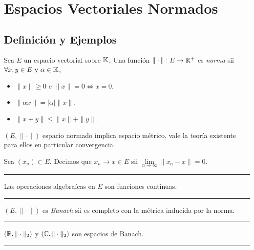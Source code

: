 \section*{Espacios Vectoriales Normados}

\subsection*{Definición y Ejemplos}

\begin{definition}
    Sea \(E\) un espacio vectorial sobre \(\mathbb{K}\). Una función \(\|\cdot\|: E\rightarrow \mathbb{R}^+ \) es \emph{norma} sii \(\forall x,y\in E \ \text{y}\ \alpha\in \K\),   
    \begin{itemize}
        \item \(\|x\|\geq 0\) e \(\|x\|=0 \Leftrightarrow x = 0\). 
        \item \(\|\alpha x\| = |\alpha|\|x\|\). 
        \item \(\|x+y\|\leq \|x\|+\|y\|\). 
    \end{itemize} 
\end{definition}

\begin{note}
    \((E,\|\cdot\|)\) espacio normado implica espacio métrico, vale la teoría existente para ellos en particular convergencia. 
\end{note}

\begin{definition}
    Sea \((x_n)\subset E\). Decimos que \(x_n\to x \in E\) sii \(\lim\limits_{n\to\infty} \|x_n - x\| = 0\).  
\end{definition}

\E

\hrule 
\begin{exercise}
    Las operaciones algebraícas en \(E\) son funciones continuas. 
\end{exercise}
\hrule 

\E

\begin{definition}
    \((E,\|\cdot\|)\) es \emph{Banach} sii es completo con la métrica inducida por la norma. 
\end{definition}

\E  

\hrule 
\begin{example}
    \((\mathbb{R},\|\cdot\|_2)\) y \((\mathbb{C},\|\cdot\|_2)\) son espacios de Banach. 
\end{example}
\hrule 

